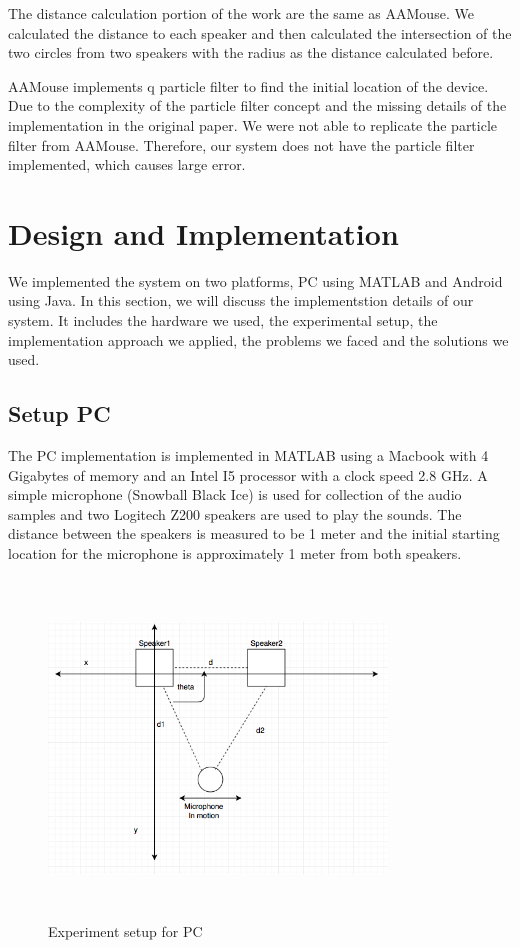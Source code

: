 \documentclass{acm_proc_article-sp}
\begin{document}
The distance calculation portion of the work are the same as AAMouse. We calculated the
distance to each speaker and then calculated the intersection of the two circles from two
speakers with the radius as the distance calculated before.

AAMouse implements q particle filter to find the initial location of the device. Due to the complexity of the particle filter concept and the missing details of the implementation
in the original paper. We were not able to replicate the particle filter from AAMouse.
Therefore, our system does not have the particle filter implemented, which causes large error.

\section{Design and Implementation} \label{design_and_implementation}
We implemented the system on two platforms, PC using MATLAB and Android using Java. In 
this section, we will discuss the implementstion details of our system. It includes the 
hardware we used, the experimental setup, the implementation approach we applied,
the problems we faced and the solutions we used.

\subsection{Setup PC}
The PC implementation is implemented in MATLAB using a Macbook with 4 Gigabytes of memory and an Intel I5 processor with a clock speed 2.8 GHz. A simple microphone (Snowball Black Ice) is used for collection of the audio samples and two Logitech Z200 speakers are used to play the sounds. The distance between the speakers is measured to be 1 meter and the initial starting location for the microphone is approximately 1 meter from both speakers.

\begin{figure}[h]
\caption{Experiment setup for PC}
\includegraphics[width=9cm, height=9cm]{PCSetup}
\end{figure}
\end{document}

